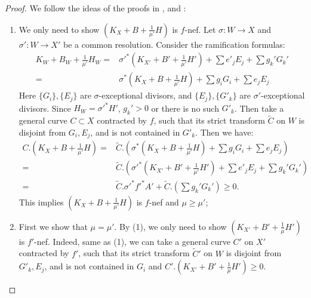 \begin{proof}
  We follow the ideas of the proofs in \cite[Claim 13.20]{haconMinimalModelProgram2012}, \cite[Theorem 5.1]{liuSarkisovProgramGeneralized2021} and \cite[Theorem 4.2]{cortiFactoringBirationalMaps}:
  \begin{enumerate}
    \item We only need to show $ (K_X+B+\frac{1}{\mu'}H) $ is $ f $-nef.   Let $\sigma:W\to X$ and $\sigma':W\to X'$ be a common resolution. Consider the ramification formulas:
          \[
            \begin{aligned}
              K_W+B_W+\frac{1}{\mu'}H_W= & \sigma'^*(K_{X'}+B'+\frac{1}{\mu'}H')+\sum e'_jE_j+ \sum g_k'G_k' \\
              =                          & \sigma^*(K_{X}+B+\frac{1}{\mu'}H)+\sum g_iG_i+\sum e_jE_j
            \end{aligned}
          \]
          Here $ \{G_i\}, \{E_j\} $ are $ \sigma $-exceptional divisors, and $ \{E_j\}, \{G'_k\} $ are $ \sigma' $-exceptional divisors. Since $H_W=\sigma'^*H' $, $ g_k'>0 $ or there is no such $ G'_k $. Then take a general curve $ C\subset X $ contracted by $ f $, such that its strict transform $ \tilde{C} $ on $ W $ is disjoint from $ G_i, E_j $, and is not contained in $ G'_k $. Then we have:
          \[
            \begin{aligned}
              C.\left(K_X+B+\frac{1}{\mu'}H\right)= & \tilde{C}.\left(\sigma^*\left(K_X+B+\frac{1}{\mu'}H\right)+\sum g_iG_i+\sum e_jE_j\right)           \\
              =                                     & \tilde{C}.\left(\sigma'^*\left(K_{X'}+B'+\frac{1}{\mu'}H'\right)+\sum e'_jE_j+ \sum g_k'G_k'\right) \\
              =                                     & \tilde{C}.\sigma'^*f'^*A'+\tilde{C}.\left(\sum g_k'G_k'\right) \geqslant0 .
            \end{aligned}
          \]
          This implies $ (K_X+B+\frac{1}{\mu'}H) $ is $ f $-nef and $ \mu\geqslant \mu' $;
    \item First we show that $ \mu=\mu' $. By (1), we only need to show $ (K_{X'}+B'+\frac{1}{\mu}H') $ is $ f' $-nef. Indeed,  same as (1), we can take a general curve $ C' $ on $X'$ contracted by $f'$, such that its strict transform $\tilde{C}'$ on $W$ is disjoint from  $ G'_k, E_j $, and is not contained in $ G_i $ and $C'.\left(K_{X'}+B'+\frac{1}{\mu}H'\right)\geqslant 0$.


\end{enumerate}
\end{proof}
